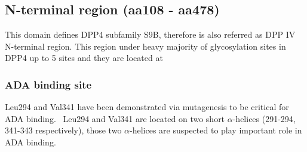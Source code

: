 \subsection{N-terminal region (aa108 - aa478)}

This domain defines DPP4 subfamily S9B, therefore is also referred as DPP IV N-terminal region. This region under heavy  majority of  glycosylation sites in DPP4 up to 5 sites and they are located at  

\subsubsection{ADA binding site}
Leu294 and Val341 have been demonstrated via mutagenesis to be critical for ADA binding.~\cite{Abbott_1999} Leu294 and Val341 are located on two short $\alpha$-helices (291-294, 341-343 respectively), those two $\alpha$-helices are suspected to play important role in ADA binding. 